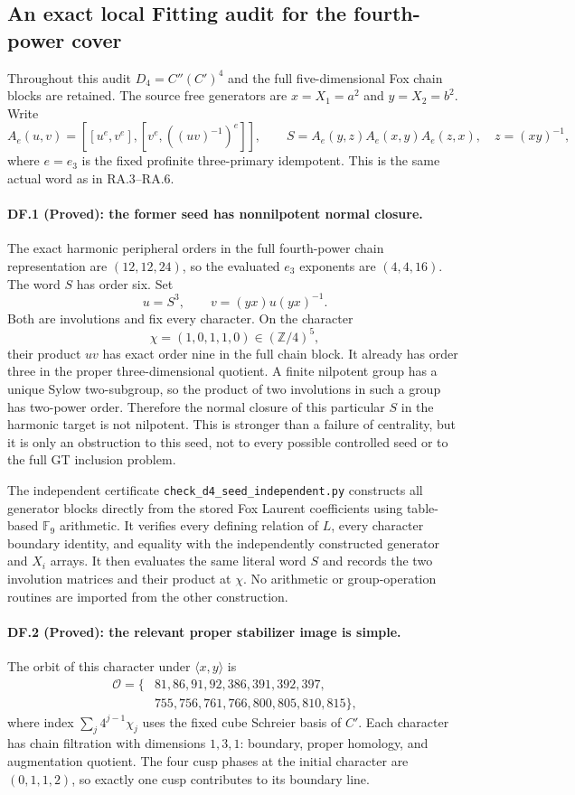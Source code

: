 \subsection*{An exact local Fitting audit for the fourth-power cover}

Throughout this audit $D_4=C''(C')^4$ and the full five-dimensional
Fox chain blocks are retained.  The source free generators are
$x=X_1=a^2$ and $y=X_2=b^2$.  Write
\[
 A_e(u,v)=[[u^e,v^e],[v^e,((uv)^{-1})^e]],\qquad
 S=A_e(y,z)A_e(x,y)A_e(z,x),\quad z=(xy)^{-1},
\]
where $e=e_3$ is the fixed profinite three-primary idempotent.
This is the same actual word as in RA.3--RA.6.

\paragraph{DF.1 (Proved): the former seed has nonnilpotent normal closure.}
The exact harmonic peripheral orders in the full fourth-power
chain representation are $(12,12,24)$, so the evaluated
$e_3$ exponents are $(4,4,16)$.  The word $S$ has order six.
Set
\[
 u=S^3,\qquad v=(yx)u(yx)^{-1}.
\]
Both are involutions and fix every character.  On the character
\[
              \chi=(1,0,1,1,0)\in(\mathbb Z/4)^5,
\]
their product $uv$ has exact order nine in the full chain block.
It already has order three in the proper three-dimensional
quotient.  A finite nilpotent group has a unique Sylow
two-subgroup, so the product of two involutions in such a
group has two-power order.  Therefore the normal closure
of this particular $S$ in the harmonic target is not nilpotent.
This is stronger than a failure of centrality, but it is
only an obstruction to this seed, not to every possible
controlled seed or to the full GT inclusion problem.

The independent certificate
\texttt{check\_d4\_seed\_independent.py} constructs all
generator blocks directly from the stored Fox Laurent
coefficients using table-based $\mathbb F_9$ arithmetic.
It verifies every defining relation of $L$, every
character boundary identity, and equality with the
independently constructed generator and $X_i$ arrays.
It then evaluates the same literal word $S$ and records
the two involution matrices and their product at $\chi$.
No arithmetic or group-operation routines are imported
from the other construction.

\paragraph{DF.2 (Proved): the relevant proper stabilizer image is simple.}
The orbit of this character under $\langle x,y\rangle$ is
\[
\begin{split}
\mathcal O=\{&81,86,91,92,386,391,392,397,\\
             &755,756,761,766,800,805,810,815\},
\end{split}
\]
where index $\sum_j4^{j-1}\chi_j$ uses the fixed cube
Schreier basis of $C'$.  Each character has chain filtration
with dimensions $1,3,1$: boundary, proper homology, and
augmentation quotient.  The four cusp phases at the
initial character are $(0,1,1,2)$, so exactly one cusp
contributes to its boundary line.

